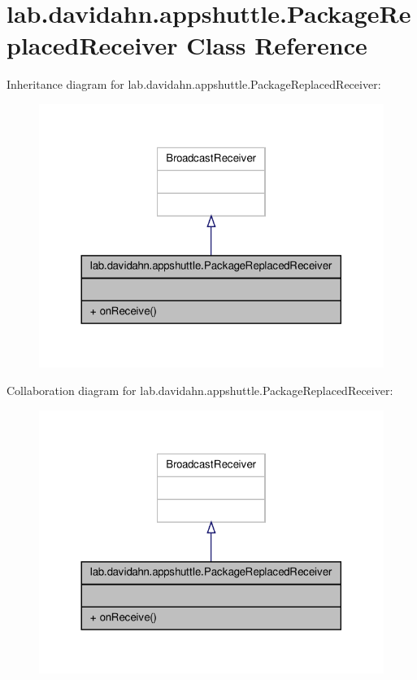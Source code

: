\hypertarget{classlab_1_1davidahn_1_1appshuttle_1_1_package_replaced_receiver}{\section{lab.\-davidahn.\-appshuttle.\-Package\-Replaced\-Receiver \-Class \-Reference}
\label{classlab_1_1davidahn_1_1appshuttle_1_1_package_replaced_receiver}
}


\-Inheritance diagram for lab.\-davidahn.\-appshuttle.\-Package\-Replaced\-Receiver\-:
\nopagebreak
\begin{figure}[H]
\begin{center}
\leavevmode
\includegraphics[width=320pt]{classlab_1_1davidahn_1_1appshuttle_1_1_package_replaced_receiver__inherit__graph}
\end{center}
\end{figure}


\-Collaboration diagram for lab.\-davidahn.\-appshuttle.\-Package\-Replaced\-Receiver\-:
\nopagebreak
\begin{figure}[H]
\begin{center}
\leavevmode
\includegraphics[width=320pt]{classlab_1_1davidahn_1_1appshuttle_1_1_package_replaced_receiver__coll__graph}
\end{center}
\end{figure}
